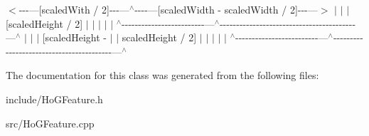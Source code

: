 $<$-\/-\/-\/---\mbox{[}scaled\+With / 2\mbox{]}-\/-\/-\/---$^\wedge$-\/-\/-\/-\/---\mbox{[}scaled\+Width -\/ scaled\+Width / 2\mbox{]}-\/-\/-\/---$>$ $\vert$ $\vert$ $\vert$ \mbox{[}scaled\+Height / 2\mbox{]} $\vert$ $\vert$ $\vert$ $\vert$ $\vert$ $^\wedge$-\/-\/-\/-\/-\/-\/-\/-\/-\/-\/-\/-\/-\/-\/-\/-\/-\/-\/-\/-\/-\/-\/-\/-\/-\/---$^\wedge$-\/-\/-\/-\/-\/-\/-\/-\/-\/-\/-\/-\/-\/-\/-\/-\/-\/-\/-\/-\/-\/-\/-\/-\/-\/-\/-\/-\/-\/-\/-\/-\/-\/-\/-\/-\/-\/-\/-\/-\/-\/---$^\wedge$ $\vert$ $\vert$ $\vert$ \mbox{[}scaled\+Height -\/ $\vert$ $\vert$ scaled\+Height / 2\mbox{]} $\vert$ $\vert$ $\vert$ $\vert$ $\vert$ $^\wedge$-\/-\/-\/-\/-\/-\/-\/-\/-\/-\/-\/-\/-\/-\/-\/-\/-\/-\/-\/-\/-\/-\/-\/-\/-\/---$^\wedge$-\/-\/-\/-\/-\/-\/-\/-\/-\/-\/-\/-\/-\/-\/-\/-\/-\/-\/-\/-\/-\/-\/-\/-\/-\/-\/-\/-\/-\/-\/-\/-\/-\/-\/-\/-\/-\/-\/-\/-\/-\/---$^\wedge$

The documentation for this class was generated from the following files\+:\begin{DoxyCompactItemize}
\item 
include/Ho\+G\+Feature.\+h\item 
src/Ho\+G\+Feature.\+cpp\end{DoxyCompactItemize}

